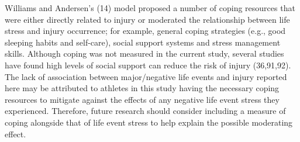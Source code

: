 \documentclass[
  english,
  man]{apa6}
\begin{document}
Williams and Andersen's (14) model proposed a number of coping resources that were either directly related to injury or moderated the relationship between life stress and injury occurrence; for example, general coping strategies (e.g., good sleeping habits and self-care), social support systems and stress management skills.
Although coping was not measured in the current study, several studies have found high levels of social support can reduce the risk of injury (36,91,92).
The lack of association between major/negative life events and injury reported here may be attributed to athletes in this study having the necessary coping resources to mitigate against the effects of any negative life event stress they experienced.
Therefore, future research should consider including a measure of coping alongside that of life event stress to help explain the possible moderating effect.
\end{document}
